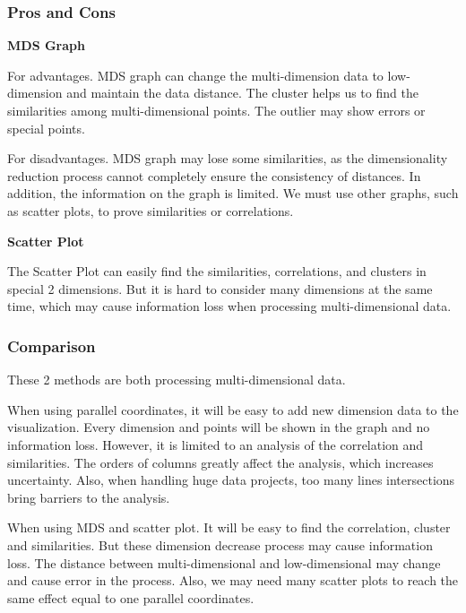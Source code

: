 \documentclass{article}
\begin{document}
\subsubsection{Pros and Cons}

\textbf{MDS Graph}

For advantages. MDS graph can change the multi-dimension data to low-dimension and maintain the data distance. The cluster helps us to find the similarities among multi-dimensional points. The outlier may show errors or special points.

For disadvantages. MDS graph may lose some similarities, as the dimensionality reduction process cannot completely ensure the consistency of distances. In addition, the information on the graph is limited. We must use other graphs, such as scatter plots, to prove similarities or correlations.

\bigskip

\noindent\textbf{Scatter Plot}

The Scatter Plot can easily find the similarities, correlations, and clusters in special 2 dimensions. But it is hard to consider many dimensions at the same time, which may cause information loss when processing multi-dimensional data.

\subsubsection{Comparison}

\indent 

These 2 methods are both processing multi-dimensional data.

When using parallel coordinates, it will be easy to add new dimension data to the visualization. Every dimension and points will be shown in the graph and no information loss. However, it is limited to an analysis of the correlation and similarities. The orders of columns greatly affect the analysis, which increases uncertainty. Also, when handling huge data projects, too many lines intersections bring barriers to the analysis.

When using MDS and scatter plot. It will be easy to find the correlation, cluster and similarities. But these dimension decrease process may cause information loss. The distance between multi-dimensional and low-dimensional may change and cause error in the process. Also, we may need many scatter plots to reach the same effect equal to one parallel coordinates.

\newpage
\end{document}
